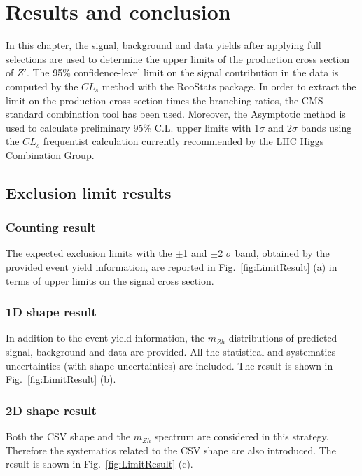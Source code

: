 \chapter{Results and conclusion}

In this chapter, the signal, background and data yields after applying full selections are used to determine the upper limits of the production cross section of $Z'$. The 95\% confidence-level limit on the signal contribution in the data is computed by the $CL_{s}$ method\cite{CLs1,CLs2} with the RooStats\cite{RooStats} package. In order to extract the limit on the production cross section times the branching ratios, the CMS standard combination tool\cite{HiggsCombineTool} has been used. Moreover, the Asymptotic method is used to calculate preliminary 95\% C.L. upper limits with 1$\sigma$ and 2$\sigma$ bands using the $CL_{s}$ frequentist calculation currently recommended by the LHC Higgs Combination Group.

\section{Exclusion limit results}

\subsection{Counting result}
The expected exclusion limits with the $\pm$1 and $\pm$2 $\sigma$ band, obtained by the provided event yield information, are reported in Fig.~\ref{fig:LimitResult} (a) in terms of upper limits on the signal cross section.

\subsection{1D shape result}
In addition to the event yield information, the $m_{Zh}$ distributions of predicted signal, background and data are provided. All the statistical and systematics uncertainties (with shape uncertainties) are included. The result is shown in Fig.~\ref{fig:LimitResult} (b).

\subsection{2D shape result}
Both the CSV shape and the $m_{Zh}$ spectrum are considered in this strategy. Therefore the systematics related to the CSV shape are also introduced. The result is shown in Fig.~\ref{fig:LimitResult} (c).

